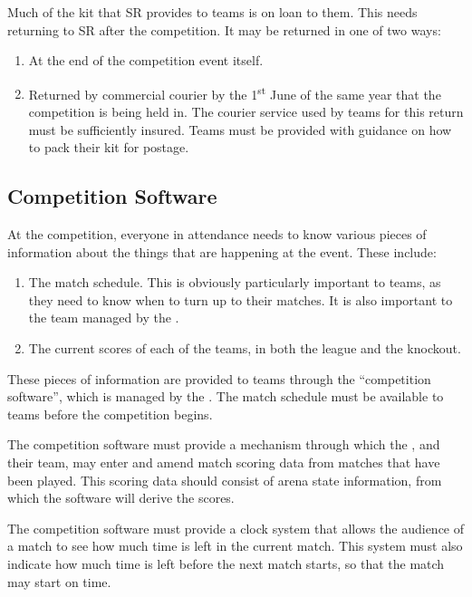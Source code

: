 Much of the kit that SR provides to teams is on loan to them.  This needs returning to SR after the competition.  It may be returned in one of two ways:

\begin{enumerate}
\item At the end of the competition event itself.
\item Returned by commercial courier by the 1\textsuperscript{st} June of the same year that the competition is being held in.  The courier service used by teams for this return must be sufficiently insured.  Teams must be provided with guidance on how to pack their kit for postage.
\end{enumerate}

\subsection{Competition Software}

At the competition, everyone in attendance needs to know various pieces of information about the things that are happening at the event.  These include:
\begin{enumerate}
\item The match schedule.  This is obviously particularly important to teams, as they need to know when to turn up to their matches.  It is also important to the team managed by the .
\item The current scores of each of the teams, in both the league and the knockout.
\end{enumerate}
These pieces of information are provided to teams through the ``competition software'', which is managed by the .  The match schedule must be available to teams before the competition begins.

The competition software must provide a mechanism through which the , and their team, may enter and amend match scoring data from matches that have been played.  This scoring data should consist of arena state information, from which the software will derive the scores.

The competition software must provide a clock system that allows the audience of a match to see how much time is left in the current match.  This system must also indicate how much time is left before the next match starts, so that the match may start on time.

